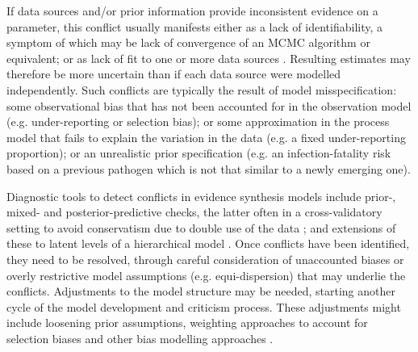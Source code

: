 \documentclass{article}
\begin{document}
If data sources and/or prior information provide inconsistent evidence on a parameter, this conflict usually manifests either as a lack of identifiability, a symptom of which may be lack of convergence of an MCMC algorithm or equivalent; or as lack of fit to one or more data sources \citep{presanis2013conflict,deangelis2018analysing}. Resulting estimates may therefore be more uncertain than if each data source were modelled independently. Such conflicts are typically the result of model misspecification: some observational bias that has not been accounted for in the observation model (e.g. under-reporting or selection bias); or some approximation in the process model that fails to explain the variation in the data (e.g. a fixed under-reporting proportion); or an unrealistic prior specification (e.g. an infection-fatality risk based on a previous pathogen which is not that similar to a newly emerging one).  

Diagnostic tools to detect conflicts in evidence synthesis models include prior-, mixed- and posterior-predictive checks, the latter often in a cross-validatory setting to avoid conservatism due to double use of the data \citep[][and references therein]{presanis2013conflict,yang2025detecting}; and extensions of these to latent levels of a hierarchical model \citep{yang2025detecting}. Once conflicts have been identified, they need to be resolved, through careful consideration of unaccounted biases or overly restrictive model assumptions (e.g. equi-dispersion) that may underlie the conflicts. Adjustments to the model structure may be needed, starting another cycle of the model development and criticism process. These adjustments might include loosening prior assumptions, weighting approaches to account for selection biases and other bias modelling approaches \citep{deangelis2018analysing}.
\end{document}
